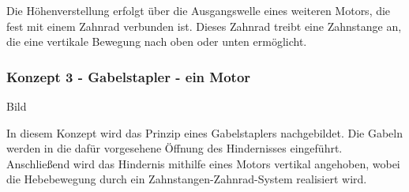 \documentclass[main.tex]{subfiles} %
\begin{document}
Die Höhenverstellung erfolgt über die Ausgangswelle eines weiteren Motors, die fest mit einem Zahnrad verbunden ist.
Dieses Zahnrad treibt eine Zahnstange an, die eine vertikale Bewegung nach oben oder unten ermöglicht.


\subsubsection*{Konzept 3 - Gabelstapler - ein Motor}

Bild \newline

In diesem Konzept wird das Prinzip eines Gabelstaplers nachgebildet. Die Gabeln werden in die dafür vorgesehene 
Öffnung des Hindernisses eingeführt. Anschließend wird das Hindernis mithilfe eines Motors vertikal angehoben, 
wobei die Hebebewegung durch ein Zahnstangen-Zahnrad-System realisiert wird.
\end{document}
